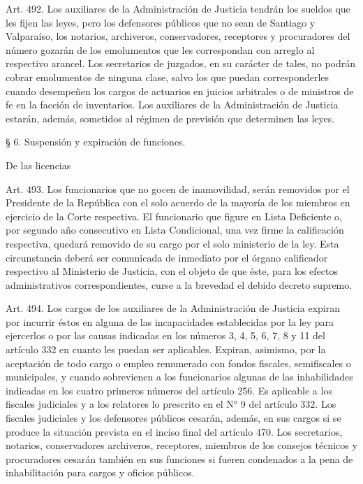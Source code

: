     Art. 492. Los auxiliares de la Administración de Justicia tendrán los sueldos que les fijen las leyes, pero los defensores públicos que no sean de Santiago y Valparaíso, los notarios, archiveros, conservadores, receptores y procuradores del número gozarán de los emolumentos que les correspondan con arreglo al respectivo arancel.
    Los secretarios de juzgados, en su carácter de tales, no podrán cobrar emolumentos de ninguna clase, salvo los que puedan corresponderles cuando desempeñen los cargos de actuarios en juicios arbitrales o de ministros de fe en la facción de inventarios.
    Los auxiliares de la Administración de Justicia estarán, además, sometidos al régimen de previsión que determinen las leyes.

    § 6. Suspensión y expiración de funciones.

    De las licencias


    Art. 493. Los funcionarios que no gocen de inamovilidad, serán removidos por el Presidente de la República con el solo acuerdo de la mayoría de los miembros en ejercicio de la Corte respectiva.
    El funcionario que figure en Lista Deficiente o, por segundo año consecutivo en Lista Condicional, una vez firme la calificación respectiva, quedará removido de su cargo por el solo ministerio de la ley.
    Esta circunstancia deberá ser comunicada de inmediato por el órgano calificador respectivo al Ministerio de Justicia, con el objeto de que éste, para los efectos administrativos correspondientes, curse a la brevedad el debido decreto supremo.



    Art. 494. Los cargos de los auxiliares de la Administración de Justicia expiran por incurrir éstos en alguna de las incapacidades establecidas por la ley para ejercerlos o por las causas indicadas en los números 3, 4, 5, 6, 7, 8 y 11 del artículo 332 en cuanto les puedan ser aplicables. Expiran, asimismo, por la aceptación de todo cargo o empleo remunerado con fondos fiscales, semifiscales o municipales, y cuando sobrevienen a los funcionarios algunas de las inhabilidades indicadas en los cuatro primeros números del artículo 256.
    Es aplicable a los fiscales judiciales y a los relatores lo prescrito en el N° 9 del artículo 332.
    Los fiscales judiciales y los defensores públicos cesarán, además, en sus cargos si se produce la situación prevista en el inciso final del artículo 470.
    Los secretarios, notarios, conservadores archiveros, receptores, miembros de los consejos técnicos y procuradores cesarán también en sus funciones si fueren condenados a la pena de inhabilitación para cargos y oficios públicos.




